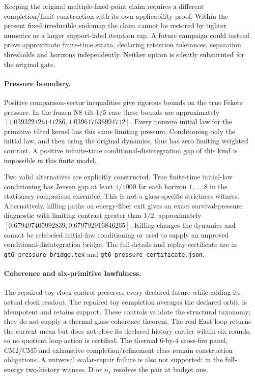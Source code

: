 \documentclass{article}
\begin{document}
Keeping the original multiple-fixed-point claim requires a different
completion/limit construction with its own applicability proof. Within the
present fixed irreducible endomap the claim cannot be restored by tighter
numerics or a larger support-label iteration cap. A future campaign could
instead prove approximate finite-time strata, declaring retention tolerances,
separation thresholds and horizons independently. Neither option is silently
substituted for the original gate.

\paragraph{Pressure boundary.}
Positive comparison-vector inequalities give rigorous bounds on the true
Fekete pressure. In the frozen N8 tilt-$1/5$ case these bounds are approximately
$[1.039322126141286,1.039617636994712]$. Every nonzero initial law for the
primitive tilted kernel has this same limiting pressure. Conditioning only
the initial law, and then using the original dynamics, thus has zero limiting
weighted contrast. A positive infinite-time conditional-disintegration gap
of this kind is impossible in this finite model.

Two valid alternatives are explicitly constructed. True finite-time
initial-law conditioning has Jensen gap at least $1/1000$ for each horizon
$1,\ldots,8$ in the stationary comparison ensemble. This is not a glass-specific
strictness witness. Alternatively, killing paths on energy-fiber exit gives
an exact survival-pressure diagnostic with limiting contrast greater than
$1/2$, approximately $[0.679497405992839,0.679792916846265]$. Killing changes
the dynamics and cannot be relabeled initial-law conditioning or used to
supply an unproved conditional-disintegration bridge. The full details and
replay certificate are in \texttt{gt6\_pressure\_bridge.tex} and
\texttt{gt6\_pressure\_certificate.json}.

\paragraph{Coherence and six-primitive lawfulness.}
The repaired toy clock control preserves every declared future while adding
its actual clock readout. The repaired toy completion averages the declared
orbit, is idempotent and retains support. These controls validate the
structural taxonomy; they do not supply a thermal glass coherence theorem.
The real East loop returns the current mean but does not close its declared
history carrier within six rounds, so no quotient loop action is certified.
The thermal 6-by-4 cross-fire panel, CM2/CM5 and exhaustive completion/refinement
class remain construction obligations. A universal scalar-repair failure is
also not supported: in the full-energy two-history witness, D or $n_1$
resolves the pair at budget one.
\end{document}
